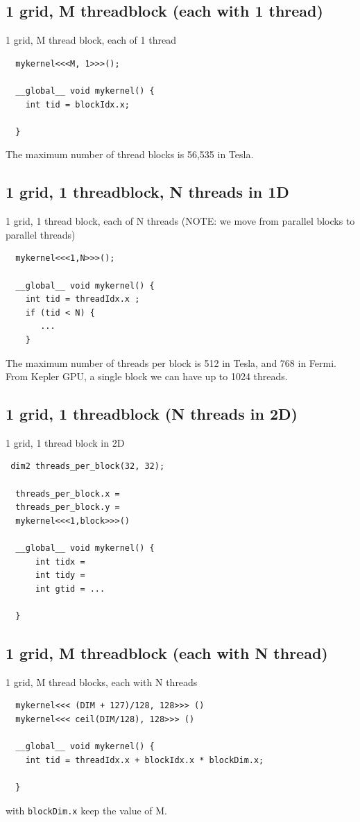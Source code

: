 \subsection{1 grid, M threadblock (each with 1 thread)}

1 grid, M thread block, each of 1 thread
  \begin{lstlisting}
  mykernel<<<M, 1>>>();
  
  __global__ void mykernel() {
    int tid = blockIdx.x;
    
  }
  \end{lstlisting}
  The maximum number of thread blocks is 56,535 in Tesla.
  
\subsection{1 grid, 1 threadblock, N threads in 1D}

1 grid, 1 thread block, each of N threads (NOTE: we move from parallel
  blocks to parallel threads)
  \begin{lstlisting}
  mykernel<<<1,N>>>();
  
  __global__ void mykernel() {
    int tid = threadIdx.x ;
    if (tid < N) {
       ...
    }
  \end{lstlisting}

The maximum number of threads per block is 512 in Tesla, and 768 in Fermi.
From Kepler GPU, a single block we can have up to 1024 threads.

\subsection{1 grid, 1 threadblock (N threads in 2D)}

 1 grid, 1 thread block in 2D
  \begin{lstlisting}
 dim2 threads_per_block(32, 32);
 
  threads_per_block.x = 
  threads_per_block.y = 
  mykernel<<<1,block>>>()
  
  __global__ void mykernel() {
      int tidx = 
      int tidy = 
      int gtid = ...
  
  }
  \end{lstlisting}
  
  
\subsection{1 grid, M threadblock (each with N thread)}

1 grid, M thread blocks, each with N threads
  \begin{lstlisting}
  mykernel<<< (DIM + 127)/128, 128>>> ()
  mykernel<<< ceil(DIM/128), 128>>> ()
  
  __global__ void mykernel() {
    int tid = threadIdx.x + blockIdx.x * blockDim.x;
    
  }
  \end{lstlisting}
  with \verb!blockDim.x! keep the value of M.
  
